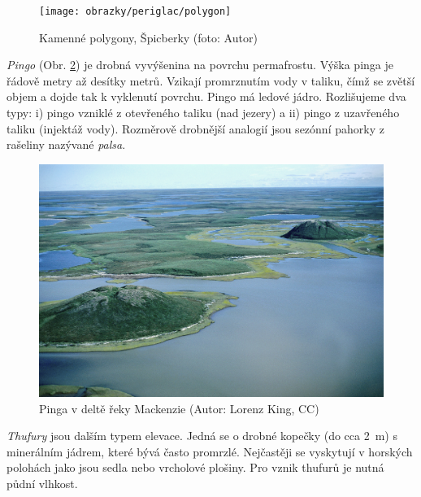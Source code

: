 \begin{figure}
	\centering
	\texttt{[image: obrazky/periglac/polygon]}
	\caption{Kamenné polygony, Špicberky (foto: Autor)}
	\label{fig:strukturni_polygon}
\end{figure}

\emph{Pingo} (Obr. \ref{fig:pingo}) je drobná vyvýšenina na povrchu permafrostu. Výška pinga je řádově metry až desítky metrů.  Vzikají promrznutím vody v taliku, čímž se zvětší objem a dojde tak k vyklenutí povrchu. Pingo má ledové jádro. Rozlišujeme dva typy: i) pingo vzniklé z otevřeného taliku (nad jezery) a ii) pingo z uzavřeného taliku (injektáž vody). Rozměrově drobnější analogií jsou sezónní pahorky z rašeliny nazývané \emph{palsa}.

\begin{figure}[t]
	\centering
	\includegraphics[width=1\linewidth]{obrazky/periglac/pingo_mackenzie}
	\caption{Pinga v deltě řeky Mackenzie (Autor: Lorenz King, CC)}
	\label{fig:pingo}
\end{figure}

\emph{Thufury} jsou dalším typem elevace. Jedná se o drobné kopečky (do cca \SI{2}{\metre}) s minerálním jádrem, které bývá často promrzlé. Nejčastěji se vyskytují v horských polohách jako jsou sedla nebo vrcholové plošiny. Pro vznik thufurů je nutná půdní vlhkost. 

